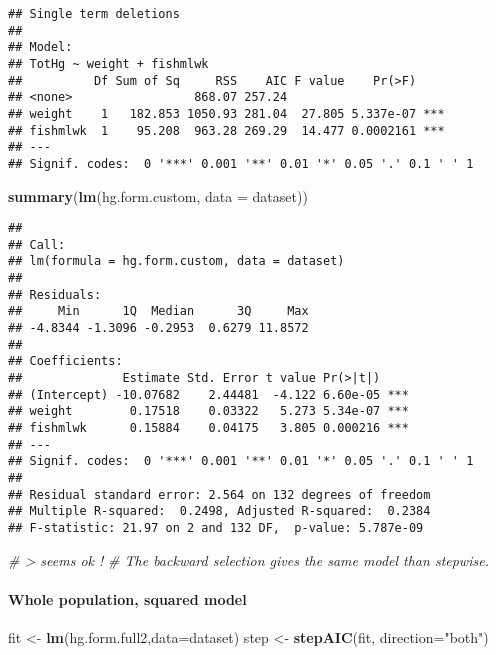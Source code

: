 \documentclass[12pt,]{article}
\newenvironment{Shaded}{\begin{snugshade}}{\end{snugshade}}
\newcommand{\KeywordTok}[1]{\textcolor[rgb]{0.13,0.29,0.53}{\textbf{#1}}}
\newcommand{\DataTypeTok}[1]{\textcolor[rgb]{0.13,0.29,0.53}{#1}}
\newcommand{\StringTok}[1]{\textcolor[rgb]{0.31,0.60,0.02}{#1}}
\newcommand{\CommentTok}[1]{\textcolor[rgb]{0.56,0.35,0.01}{\textit{#1}}}
\newcommand{\NormalTok}[1]{#1}
\let\oldparagraph\paragraph
\renewcommand{\paragraph}[1]{\oldparagraph{#1}\mbox{}}
\begin{document}
\begin{verbatim}
## Single term deletions
## 
## Model:
## TotHg ~ weight + fishmlwk
##          Df Sum of Sq     RSS    AIC F value    Pr(>F)    
## <none>                 868.07 257.24                      
## weight    1   182.853 1050.93 281.04  27.805 5.337e-07 ***
## fishmlwk  1    95.208  963.28 269.29  14.477 0.0002161 ***
## ---
## Signif. codes:  0 '***' 0.001 '**' 0.01 '*' 0.05 '.' 0.1 ' ' 1
\end{verbatim}

\begin{Shaded}
\begin{Highlighting}[]
\KeywordTok{summary}\NormalTok{(}\KeywordTok{lm}\NormalTok{(hg.form.custom, }\DataTypeTok{data =}\NormalTok{ dataset))}
\end{Highlighting}
\end{Shaded}

\begin{verbatim}
## 
## Call:
## lm(formula = hg.form.custom, data = dataset)
## 
## Residuals:
##     Min      1Q  Median      3Q     Max 
## -4.8344 -1.3096 -0.2953  0.6279 11.8572 
## 
## Coefficients:
##              Estimate Std. Error t value Pr(>|t|)    
## (Intercept) -10.07682    2.44481  -4.122 6.60e-05 ***
## weight        0.17518    0.03322   5.273 5.34e-07 ***
## fishmlwk      0.15884    0.04175   3.805 0.000216 ***
## ---
## Signif. codes:  0 '***' 0.001 '**' 0.01 '*' 0.05 '.' 0.1 ' ' 1
## 
## Residual standard error: 2.564 on 132 degrees of freedom
## Multiple R-squared:  0.2498, Adjusted R-squared:  0.2384 
## F-statistic: 21.97 on 2 and 132 DF,  p-value: 5.787e-09
\end{verbatim}

\begin{Shaded}
\begin{Highlighting}[]
\CommentTok{# > seems ok !}
\CommentTok{# The backward selection gives the same model than stepwise.}
\end{Highlighting}
\end{Shaded}

\paragraph{Whole population, squared
model}\label{whole-population-squared-model}

\begin{Shaded}
\begin{Highlighting}[]
\NormalTok{fit <-}\StringTok{ }\KeywordTok{lm}\NormalTok{(hg.form.full2,}\DataTypeTok{data=}\NormalTok{dataset)}
\NormalTok{step <-}\StringTok{ }\KeywordTok{stepAIC}\NormalTok{(fit, }\DataTypeTok{direction=}\StringTok{"both"}\NormalTok{)}
\end{Highlighting}
\end{Shaded}
\end{document}
